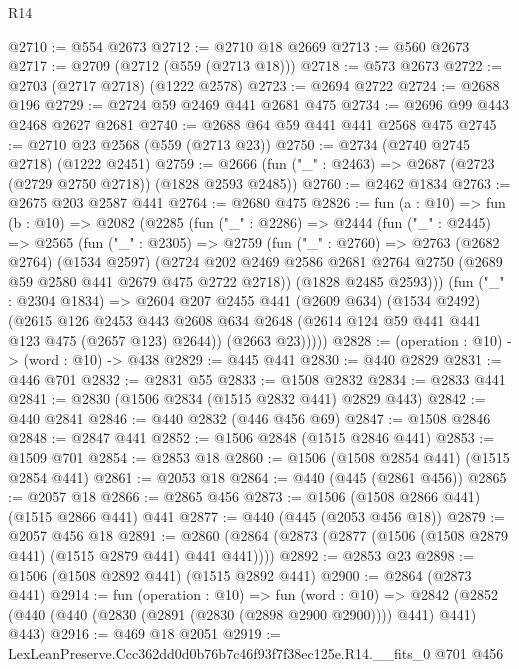 \begin{lexlean}{R14}
\begin{coremodule}
@2710 := @554 @2673
@2712 := @2710 @18 @2669
@2713 := @560 @2673
@2717 := @2709 (@2712 (@559 (@2713 @18)))
@2718 := @573 @2673
@2722 := @2703 (@2717 @2718) (@1222 @2578)
@2723 := @2694 @2722
@2724 := @2688 @196
@2729 := @2724 @59 @2469 @441 @2681 @475
@2734 := @2696 @99 @443 @2468 @2627 @2681
@2740 := @2688 @64 @59 @441 @441 @2568 @475
@2745 := @2710 @23 @2568 (@559 (@2713 @23))
@2750 := @2734 (@2740 @2745 @2718) (@1222 @2451)
@2759 := @2666 (fun ("_" : @2463) => @2687 (@2723 (@2729 @2750 @2718)) (@1828 @2593 @2485))
@2760 := @2462 @1834
@2763 := @2675 @203 @2587 @441
@2764 := @2680 @475
@2826 := fun (a : @10) =>
  fun (b : @10) =>
  @2082
    (@2285
      (fun ("_" : @2286) =>
      @2444
        (fun ("_" : @2445) =>
        @2565
          (fun ("_" : @2305) =>
          @2759
            (fun ("_" : @2760) =>
            @2763
              (@2682 @2764)
              (@1534 @2597)
              (@2724
                @202
                @2469
                @2586
                @2681
                @2764
                @2750
                (@2689 @59 @2580 @441 @2679 @475 @2722 @2718))
              (@1828 @2485 @2593)))
          (fun ("_" : @2304 @1834) =>
          @2604
            @207
            @2455
            @441
            (@2609 @634)
            (@1534 @2492)
            (@2615
              @126
              @2453
              @443
              @2608
              @634
              @2648
              (@2614 @124 @59 @441 @441 @123 @475 (@2657 @123) @2644))
            (@2663 @23)))))
@2828 := (operation : @10) -> (word : @10) -> @438
@2829 := @445 @441
@2830 := @440 @2829
@2831 := @446 @701
@2832 := @2831 @55
@2833 := @1508 @2832
@2834 := @2833 @441
@2841 := @2830 (@1506 @2834 (@1515 @2832 @441) @2829 @443)
@2842 := @440 @2841
@2846 := @440 @2832 (@446 @456 @69)
@2847 := @1508 @2846
@2848 := @2847 @441
@2852 := @1506 @2848 (@1515 @2846 @441)
@2853 := @1509 @701
@2854 := @2853 @18
@2860 := @1506 (@1508 @2854 @441) (@1515 @2854 @441)
@2861 := @2053 @18
@2864 := @440 (@445 (@2861 @456))
@2865 := @2057 @18
@2866 := @2865 @456
@2873 := @1506 (@1508 @2866 @441) (@1515 @2866 @441) @441
@2877 := @440 (@445 (@2053 @456 @18))
@2879 := @2057 @456 @18
@2891 := @2860 (@2864 (@2873 (@2877 (@1506 (@1508 @2879 @441) (@1515 @2879 @441) @441 @441))))
@2892 := @2853 @23
@2898 := @1506 (@1508 @2892 @441) (@1515 @2892 @441)
@2900 := @2864 (@2873 @441)
@2914 := fun (operation : @10) =>
  fun (word : @10) =>
  @2842 (@2852 (@440 (@440 (@2830 (@2891 (@2830 (@2898 @2900 @2900)))) @441) @441) @443)
@2916 := @469 @18 @2051
@2919 := LexLeanPreserve.Ccc362dd0d0b76b7c46f93f7f38ec125e.R14.__fits_0 @701 @456

\end{coremodule}
\end{lexlean}
